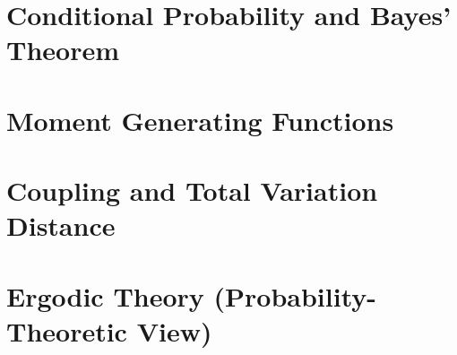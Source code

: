 \section{Conditional Probability and Bayes' Theorem}




\section{Moment Generating Functions}




\section{Coupling and Total Variation Distance}




\section{Ergodic Theory (Probability-Theoretic View)}


